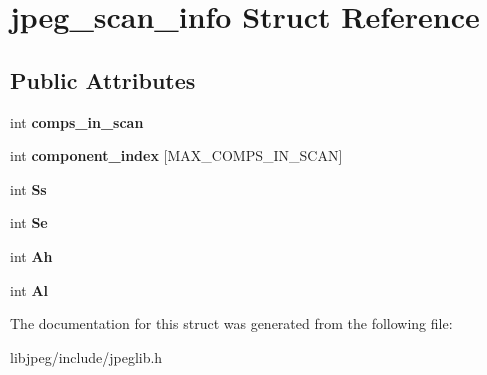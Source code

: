 \hypertarget{structjpeg__scan__info}{\section{jpeg\-\_\-scan\-\_\-info Struct Reference}
\label{structjpeg__scan__info}
}
\subsection*{Public Attributes}
\begin{DoxyCompactItemize}
\item 
\hypertarget{structjpeg__scan__info_addd94bff3ee52f961cf6fda5ea86ddca}{int {\bfseries comps\-\_\-in\-\_\-scan}}\label{structjpeg__scan__info_addd94bff3ee52f961cf6fda5ea86ddca}

\item 
\hypertarget{structjpeg__scan__info_adae9b3ceda4c7c14c9e18ae763db3570}{int {\bfseries component\-\_\-index} \mbox{[}M\-A\-X\-\_\-\-C\-O\-M\-P\-S\-\_\-\-I\-N\-\_\-\-S\-C\-A\-N\mbox{]}}\label{structjpeg__scan__info_adae9b3ceda4c7c14c9e18ae763db3570}

\item 
\hypertarget{structjpeg__scan__info_a33bc5abcded36ccd1b4c2ec94f6e2ba5}{int {\bfseries Ss}}\label{structjpeg__scan__info_a33bc5abcded36ccd1b4c2ec94f6e2ba5}

\item 
\hypertarget{structjpeg__scan__info_a4eefb8be0412f78566862c28a20fb254}{int {\bfseries Se}}\label{structjpeg__scan__info_a4eefb8be0412f78566862c28a20fb254}

\item 
\hypertarget{structjpeg__scan__info_a43834ca9482c7ea12cc97cf602da004b}{int {\bfseries Ah}}\label{structjpeg__scan__info_a43834ca9482c7ea12cc97cf602da004b}

\item 
\hypertarget{structjpeg__scan__info_a89cc9e990977c50b2b2058e6b9526e67}{int {\bfseries Al}}\label{structjpeg__scan__info_a89cc9e990977c50b2b2058e6b9526e67}

\end{DoxyCompactItemize}


The documentation for this struct was generated from the following file\-:\begin{DoxyCompactItemize}
\item 
libjpeg/include/jpeglib.\-h\end{DoxyCompactItemize}
